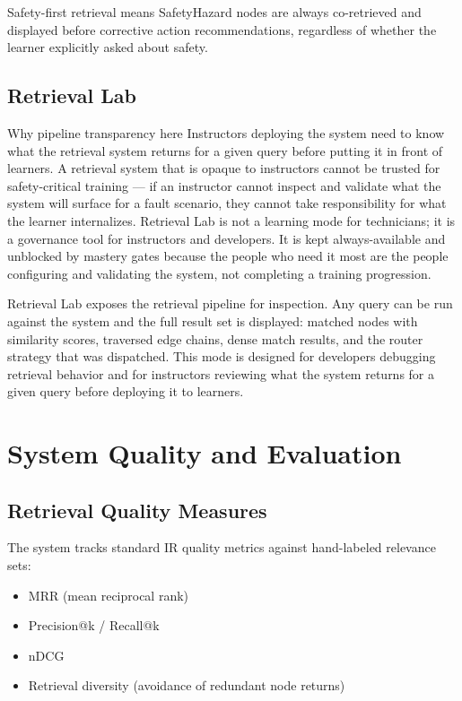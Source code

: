 \documentclass[11pt,letterpaper]{article}
\begin{document}
Safety-first retrieval means SafetyHazard nodes are always co-retrieved and displayed before corrective action recommendations, regardless of whether the learner explicitly asked about safety.

\subsection{Retrieval Lab}
\label{sec:retrieval-lab}

\begin{rationale}{Why pipeline transparency here}
Instructors deploying the system need to know what the retrieval system returns for a given query before putting it in front of learners. A retrieval system that is opaque to instructors cannot be trusted for safety-critical training --- if an instructor cannot inspect and validate what the system will surface for a fault scenario, they cannot take responsibility for what the learner internalizes. Retrieval Lab is not a learning mode for technicians; it is a governance tool for instructors and developers. It is kept always-available and unblocked by mastery gates because the people who need it most are the people configuring and validating the system, not completing a training progression.
\end{rationale}

Retrieval Lab exposes the retrieval pipeline for inspection. Any query can be run against the system and the full result set is displayed: matched nodes with similarity scores, traversed edge chains, dense match results, and the router strategy that was dispatched. This mode is designed for developers debugging retrieval behavior and for instructors reviewing what the system returns for a given query before deploying it to learners.

\section{System Quality and Evaluation}
\label{sec:evaluation}

\subsection{Retrieval Quality Measures}
The system tracks standard IR quality metrics against hand-labeled relevance sets:
\begin{itemize}
  \item MRR (mean reciprocal rank)
  \item Precision@k / Recall@k
  \item nDCG
  \item Retrieval diversity (avoidance of redundant node returns)
\end{itemize}
\end{document}
